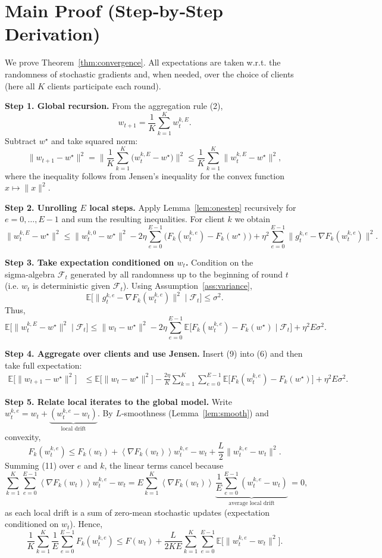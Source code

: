 \documentclass[11pt]{article}
\newcommand{\E}{\mathbb{E}}
\newcommand{\inner}[1]{\left\langle #1\right\rangle}
\begin{document}
\section*{Main Proof (Step‑by‑Step Derivation)}
We prove Theorem~\ref{thm:convergence}.  All expectations are taken w.r.t. the randomness of stochastic gradients and, when needed, over the choice of clients (here all $K$ clients participate each round).

\bigskip
\noindent\textbf{Step 1.  Global recursion.}  
From the aggregation rule (2),
\[
w_{t+1}= \frac1K\sum_{k=1}^K w_{t}^{k,E}.
\tag{5}
\]
Subtract $w^\star$ and take squared norm:
\[
\|w_{t+1}-w^\star\|^2
= \Big\|\frac1K\sum_{k=1}^K\big(w_{t}^{k,E}-w^\star\big)\Big\|^2
\le \frac1K\sum_{k=1}^K\|w_{t}^{k,E}-w^\star\|^2,
\tag{6}
\]
where the inequality follows from Jensen’s inequality for the convex function $x\mapsto\|x\|^2$.

\bigskip
\noindent\textbf{Step 2.  Unrolling $E$ local steps.}  
Apply Lemma~\ref{lem:onestep} recursively for $e=0,\dots,E-1$ and sum the resulting inequalities.  For client $k$ we obtain
\[
\|w_{t}^{k,E}-w^\star\|^2
\le
\|w_{t}^{k,0}-w^\star\|^2
-2\eta\sum_{e=0}^{E-1}\!\big(F_k(w_{t}^{k,e})-F_k(w^\star)\big)
+\eta^2\!\sum_{e=0}^{E-1}\!\|g_{t}^{k,e}-\nabla F_k(w_{t}^{k,e})\|^2 .
\tag{7}
\]

\bigskip
\noindent\textbf{Step 3.  Take expectation conditioned on $w_t$.}  
Condition on the sigma‑algebra $\mathcal{F}_t$ generated by all randomness up to the beginning of round $t$ (i.e. $w_t$ is deterministic given $\mathcal{F}_t$).  Using Assumption~\ref{ass:variance},
\[
\E\!\big[\|g_{t}^{k,e}-\nabla F_k(w_{t}^{k,e})\|^2\mid\mathcal{F}_t\big]\le\sigma^2 .
\tag{8}
\]
Thus,
\[
\E\!\big[\|w_{t}^{k,E}-w^\star\|^2\mid\mathcal{F}_t\big]
\le
\|w_t-w^\star\|^2
-2\eta\sum_{e=0}^{E-1}\E\!\big[F_k(w_{t}^{k,e})-F_k(w^\star)\mid\mathcal{F}_t\big]
+ \eta^2E\sigma^2 .
\tag{9}
\]

\bigskip
\noindent\textbf{Step 4.  Aggregate over clients and use Jensen.}  
Insert (9) into (6) and then take full expectation:
\[
\begin{aligned}
\E\!\big[\|w_{t+1}-w^\star\|^2\big]
&\le
\E\!\big[\|w_t-w^\star\|^2\big]
- \frac{2\eta}{K}\sum_{k=1}^K\sum_{e=0}^{E-1}
\E\!\big[F_k(w_{t}^{k,e})-F_k(w^\star)\big]
+ \eta^2E\sigma^2 .
\end{aligned}
\tag{10}
\]

\bigskip
\noindent\textbf{Step 5.  Relate local iterates to the global model.}  
Write $w_{t}^{k,e}=w_t+\underbrace{(w_{t}^{k,e}-w_t)}_{\text{local drift}}$.  
By $L$‑smoothness (Lemma~\ref{lem:smooth}) and convexity,
\[
F_k(w_{t}^{k,e})\le F_k(w_t)+\inner{\nabla F_k(w_t)}{w_{t}^{k,e}-w_t}
+\frac{L}{2}\|w_{t}^{k,e}-w_t\|^2 .
\tag{11}
\]
Summing (11) over $e$ and $k$, the linear terms cancel because
\[
\sum_{k=1}^K\sum_{e=0}^{E-1}\inner{\nabla F_k(w_t)}{w_{t}^{k,e}-w_t}
=E\sum_{k=1}^K\inner{\nabla F_k(w_t)}{\,\underbrace{\frac1E\sum_{e=0}^{E-1}(w_{t}^{k,e}-w_t)}_{\text{average local drift}}\,}=0,
\]
as each local drift is a sum of zero‑mean stochastic updates (expectation conditioned on $w_t$).  Hence,
\[
\frac1K\sum_{k=1}^K\frac1E\sum_{e=0}^{E-1}F_k(w_{t}^{k,e})
\le
F(w_t)+\frac{L}{2K E}\sum_{k=1}^K\sum_{e=0}^{E-1}\E\!\big[\|w_{t}^{k,e}-w_t\|^2\big].
\tag{12}
\]
\end{document}

